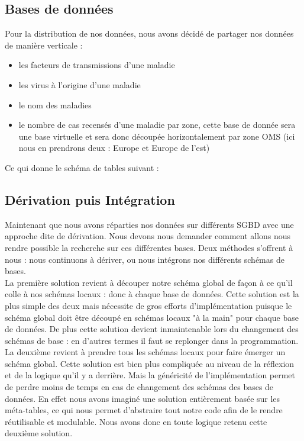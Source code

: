 \documentclass[12pt]{article}
\begin{document}
\subsection{Bases de données}

	Pour la distribution de nos données, nous avons décidé de partager nos données de manière verticale :\\
	\begin{itemize}
		\item les facteurs de transmissions d'une maladie\\
		\item les virus à l'origine d'une maladie\\
		\item le nom des maladies\\
		\item le nombre de cas recensés d'une maladie par zone, cette base de donnée sera une base virtuelle et sera donc découpée horizontalement par zone OMS (ici nous en prendrons deux : Europe et Europe de l'est)\\
	\end{itemize}
	Ce qui donne le schéma de tables suivant :

\subsection{Dérivation puis Intégration}

	Maintenant que nous avons réparties nos données sur différents SGBD avec une approche dite de dérivation. Nous devons nous demander comment allons nous rendre possible la recherche sur ces différentes bases. Deux méthodes s'offrent à nous : nous continuons à dériver, ou nous intégrons nos différents schémas de bases.\\
	\indent La première solution revient à découper notre schéma global de façon à ce qu'il colle à nos schémas locaux : donc à chaque base de données. Cette solution est la plus simple des deux mais nécessite de gros efforts d'implémentation puisque le schéma global doit être découpé en schémas locaux "à la main" pour chaque base de données. De plus cette solution devient inmaintenable lors du changement des schémas de base : en d'autres termes il faut se replonger dans la programmation.\\
	\indent La deuxième revient à prendre tous les schémas locaux pour faire émerger un schéma global. Cette solution est bien plus compliquée au niveau de la réflexion et de la logique qu'il y a derrière. Mais la généricité de l'implémentation permet de perdre moins de temps en cas de changement des schémas des bases de données. En effet nous avons imaginé une solution entièrement basée sur les méta-tables, ce qui nous permet d'abstraire tout notre code afin de le rendre réutilisable et modulable. Nous avons donc en toute logique retenu cette deuxième solution.\\
\end{document}
